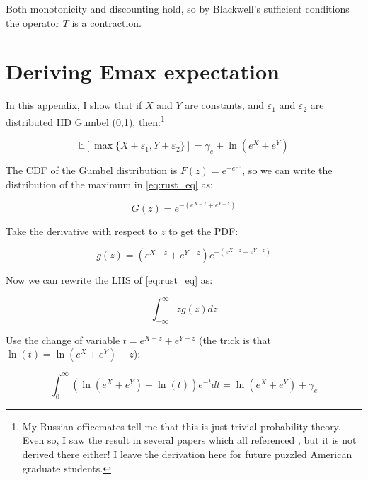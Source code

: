 Both monotonicity and discounting hold, so by Blackwell's sufficient conditions the operator $T$ is a contraction.

\section{Deriving Emax expectation}
\label{sec:exp_der}

In this appendix, I show that if $X$ and $Y$ are constants, and $\varepsilon_1$ and $\varepsilon_2$ are distributed IID Gumbel (0,1), then:\footnote{My Russian officemates tell me that this is just trivial probability theory.  Even so, I saw the result in several papers which all referenced \citet{rust1987optimal}, but it is not derived there either!  I leave the derivation here for future puzzled American graduate students.}

\begin{equation}
    \mathbb{E} \left[\max\{X + \varepsilon_1, Y + \varepsilon_2\}\right] = \gamma_e + \ln \left(e^{X} + e^{Y}\right)
    \label{eq:rust_eq}
\end{equation}

The CDF of the Gumbel distribution is $F(z) = e^{-e^{-z}}$, so we can write the distribution of the maximum in \eqref{eq:rust_eq} as:

\begin{equation}
    G(z) = e^{-\left(e^{X - z} + e^{Y - z}\right)}
\end{equation}

Take the derivative with respect to $z$ to get the PDF:

\begin{equation}
    g(z) = \left(e^{X - z} + e^{Y - z}\right) e^{-\left(e^{X - z} + e^{Y - z}\right)}
\end{equation}

Now we can rewrite the LHS of \eqref{eq:rust_eq} as:

\begin{equation}
    \int_{-\infty}^\infty z g(z) dz 
\end{equation}

Use the change of variable $t = e^{X - z} + e^{Y - z}$ (the trick is that $\ln(t) = \ln\left(e^X + e^Y\right) - z$):

\begin{equation}
    \int_{0}^\infty \left(\ln \left(e^X + e^Y\right) - \ln(t)\right) e^{-t} dt = \ln \left(e^X + e^Y\right) + \gamma_e
\end{equation}

